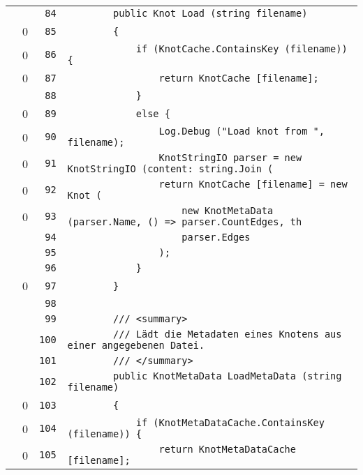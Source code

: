 \documentclass[a4paper,10pt]{article}
\begin{document}
\begin{longtable}[l]{lrrl}
\cellcolor{gray} &  & \verb~84~ & \verb~        public Knot Load (string filename)~\\
\cellcolor{red} & 0 & \verb~85~ & \verb~        {~\\
\cellcolor{red} & 0 & \verb~86~ & \verb~            if (KnotCache.ContainsKey (filename)) {~\\
\cellcolor{red} & 0 & \verb~87~ & \verb~                return KnotCache [filename];~\\
\cellcolor{gray} &  & \verb~88~ & \verb~            }~\\
\cellcolor{red} & 0 & \verb~89~ & \verb~            else {~\\
\cellcolor{red} & 0 & \verb~90~ & \verb~                Log.Debug ("Load knot from ", filename);~\\
\cellcolor{red} & 0 & \verb~91~ & \verb~                KnotStringIO parser = new KnotStringIO (content: string.Join (~\\
\cellcolor{red} & 0 & \verb~92~ & \verb~                return KnotCache [filename] = new Knot (~\\
\cellcolor{red} & 0 & \verb~93~ & \verb~                    new KnotMetaData (parser.Name, () => parser.CountEdges, th~\\
\cellcolor{gray} &  & \verb~94~ & \verb~                    parser.Edges~\\
\cellcolor{gray} &  & \verb~95~ & \verb~                );~\\
\cellcolor{gray} &  & \verb~96~ & \verb~            }~\\
\cellcolor{red} & 0 & \verb~97~ & \verb~        }~\\
\cellcolor{gray} &  & \verb~98~ & \verb~~\\
\cellcolor{gray} &  & \verb~99~ & \verb~        /// <summary>~\\
\cellcolor{gray} &  & \verb~100~ & \verb~        /// Lädt die Metadaten eines Knotens aus einer angegebenen Datei.~\\
\cellcolor{gray} &  & \verb~101~ & \verb~        /// </summary>~\\
\cellcolor{gray} &  & \verb~102~ & \verb~        public KnotMetaData LoadMetaData (string filename)~\\
\cellcolor{red} & 0 & \verb~103~ & \verb~        {~\\
\cellcolor{red} & 0 & \verb~104~ & \verb~            if (KnotMetaDataCache.ContainsKey (filename)) {~\\
\cellcolor{red} & 0 & \verb~105~ & \verb~                return KnotMetaDataCache [filename];~\\

\end{longtable}
\end{document}
